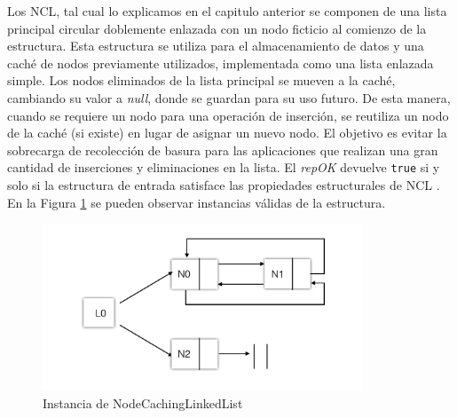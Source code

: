 Los NCL, tal cual lo explicamos en el capitulo anterior  se componen de una lista principal circular doblemente enlazada con un nodo ficticio al comienzo de la estructura. 
Esta estructura se utiliza para el almacenamiento de datos y una caché de nodos previamente utilizados, 
implementada como una lista enlazada simple. Los nodos eliminados de la lista principal se mueven a la caché, 
cambiando su valor a \emph{null}, donde se guardan para su uso futuro. 
De esta manera, cuando se requiere un nodo para una operación de inserción, se reutiliza un nodo de la caché (si existe) 
en lugar de asignar un nuevo nodo. 
El objetivo es evitar la sobrecarga de recolección de basura para las aplicaciones que realizan una gran cantidad de inserciones y
eliminaciones en la lista. El \emph{repOK} devuelve \texttt{true} si y solo si la estructura de entrada satisface las propiedades estructurales de NCL \cite{Liskov00}. 
En la Figura \ref{fig:nclInstanceRepOK} se pueden observar instancias válidas de
la estructura. 

\begin{figure}[H]
    \centering
    \includegraphics[width=0.85\textwidth]{NCL.jpg}
    \caption{Instancia de NodeCachingLinkedList}
    \label{fig:nclInstanceRepOK}
\end{figure}

